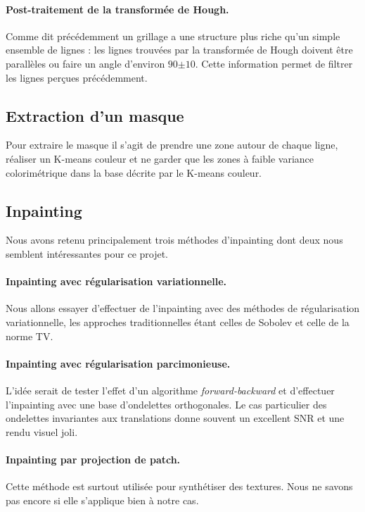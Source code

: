 \documentclass[10pt,a4paper]{article}
\begin{document}
\paragraph{Post-traitement de la transformée de Hough. }Comme dit précédemment un grillage a une structure plus riche qu'un simple ensemble de lignes : les lignes trouvées par la transformée de Hough doivent être parallèles ou faire un angle d'environ $90$\degre $\pm 10$\degre. Cette information permet de filtrer les lignes perçues précédemment.

\subsection{Extraction d'un masque}
Pour extraire le masque il s'agit de prendre une zone autour de chaque ligne, réaliser un K-means couleur et ne garder que les zones à faible variance colorimétrique dans la base décrite par le K-means couleur.

\subsection{Inpainting}

Nous avons retenu principalement trois méthodes d'inpainting dont deux nous semblent intéressantes pour ce projet.

\paragraph{Inpainting avec régularisation variationnelle. }Nous allons essayer d'effectuer de l'inpainting avec des méthodes de régularisation variationnelle, les approches traditionnelles étant celles de Sobolev et celle de la norme TV. 

\paragraph{Inpainting avec régularisation parcimonieuse. }L'idée serait de tester l'effet d'un algorithme \emph{forward-backward} et d'effectuer l'inpainting avec une base d'ondelettes orthogonales. Le cas particulier des ondelettes invariantes aux translations donne souvent un excellent SNR et une rendu visuel joli.

\paragraph{Inpainting par projection de patch. }Cette méthode est surtout utilisée pour synthétiser des textures. Nous ne savons pas encore si elle s'applique bien à notre cas.
\end{document}
